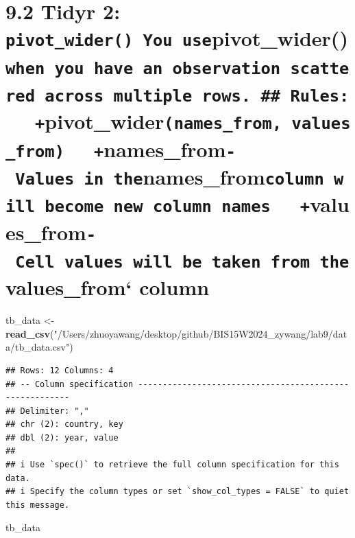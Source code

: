 \documentclass[
]{article}
\newenvironment{Shaded}{\begin{snugshade}}{\end{snugshade}}
\newcommand{\FunctionTok}[1]{\textcolor[rgb]{0.13,0.29,0.53}{\textbf{#1}}}
\newcommand{\NormalTok}[1]{#1}
\newcommand{\OtherTok}[1]{\textcolor[rgb]{0.56,0.35,0.01}{#1}}
\newcommand{\StringTok}[1]{\textcolor[rgb]{0.31,0.60,0.02}{#1}}
\begin{document}
\hypertarget{tidyr-2-pivot_wider-you-usepivot_widerwhen-you-have-an-observation-scattered-across-multiple-rows.-rules-pivot_widernames_from-values_from-names_from--values-in-thenames_fromcolumn-will-become-new-column-names-values_from--cell-values-will-be-taken-from-thevalues_from-column}{%
\section{\texorpdfstring{9.2 Tidyr 2:
\texttt{pivot\_wider()\ You\ use}pivot\_wider()\texttt{when\ you\ have\ an\ observation\ scattered\ across\ multiple\ rows.\ \#\#\ Rules:\ \ \ +}pivot\_wider\texttt{(names\_from,\ values\_from)\ \ \ +}names\_from\texttt{-\ Values\ in\ the}names\_from\texttt{column\ will\ become\ new\ column\ names\ \ \ +}values\_from\texttt{-\ Cell\ values\ will\ be\ taken\ from\ the}values\_from`
column}{9.2 Tidyr 2: pivot\_wider() You usepivot\_wider()when you have an observation scattered across multiple rows. \#\# Rules:   +pivot\_wider(names\_from, values\_from)   +names\_from- Values in thenames\_fromcolumn will become new column names   +values\_from- Cell values will be taken from thevalues\_from` column}}\label{tidyr-2-pivot_wider-you-usepivot_widerwhen-you-have-an-observation-scattered-across-multiple-rows.-rules-pivot_widernames_from-values_from-names_from--values-in-thenames_fromcolumn-will-become-new-column-names-values_from--cell-values-will-be-taken-from-thevalues_from-column}}

\begin{Shaded}
\begin{Highlighting}[]
\NormalTok{tb\_data }\OtherTok{\textless{}{-}} \FunctionTok{read\_csv}\NormalTok{(}\StringTok{"/Users/zhuoyawang/desktop/github/BIS15W2024\_zywang/lab9/data/tb\_data.csv"}\NormalTok{)}
\end{Highlighting}
\end{Shaded}

\begin{verbatim}
## Rows: 12 Columns: 4
## -- Column specification --------------------------------------------------------
## Delimiter: ","
## chr (2): country, key
## dbl (2): year, value
## 
## i Use `spec()` to retrieve the full column specification for this data.
## i Specify the column types or set `show_col_types = FALSE` to quiet this message.
\end{verbatim}

\begin{Shaded}
\begin{Highlighting}[]
\NormalTok{tb\_data}
\end{Highlighting}
\end{Shaded}
\end{document}
